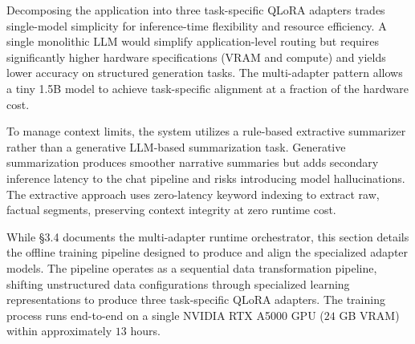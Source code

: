 \documentclass[12pt, a4paper]{report}
\begin{document}
\vspace{0.3cm}

Decomposing the application into three task-specific QLoRA adapters trades single-model simplicity for inference-time flexibility and resource efficiency. A single monolithic LLM would simplify application-level routing but requires significantly higher hardware specifications (VRAM and compute) and yields lower accuracy on structured generation tasks. The multi-adapter pattern allows a tiny 1.5B model to achieve task-specific alignment at a fraction of the hardware cost.

\vspace{0.3cm}

To manage context limits, the system utilizes a rule-based extractive summarizer rather than a generative LLM-based summarization task. Generative summarization produces smoother narrative summaries but adds secondary inference latency to the chat pipeline and risks introducing model hallucinations. The extractive approach uses zero-latency keyword indexing to extract raw, factual segments, preserving context integrity at zero runtime cost.

\vspace{0.8cm}
\vspace{0.4cm}

\vspace{0.4cm}

While \S3.4 documents the multi-adapter runtime orchestrator, this section details the offline training pipeline designed to produce and align the specialized adapter models. The pipeline operates as a sequential data transformation pipeline, shifting unstructured data configurations through specialized learning representations to produce three task-specific QLoRA adapters. The training process runs end-to-end on a single NVIDIA RTX A5000 GPU ($24$ GB VRAM) within approximately $13$ hours.
\end{document}
